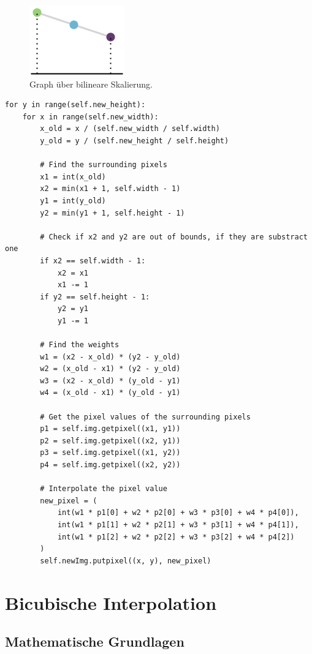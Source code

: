 \begin{figure}
    \centering
    \includegraphics{img/pixel_verdopplung_graph.png}
    \caption{Graph über bilineare Skalierung.}
    \label{fig:my_label}
\end{figure}


\begin{lstlisting}
for y in range(self.new_height):
    for x in range(self.new_width):
        x_old = x / (self.new_width / self.width)
        y_old = y / (self.new_height / self.height)

        # Find the surrounding pixels
        x1 = int(x_old)
        x2 = min(x1 + 1, self.width - 1)
        y1 = int(y_old)
        y2 = min(y1 + 1, self.height - 1)

        # Check if x2 and y2 are out of bounds, if they are substract one
        if x2 == self.width - 1:
            x2 = x1
            x1 -= 1
        if y2 == self.height - 1:
            y2 = y1
            y1 -= 1

        # Find the weights
        w1 = (x2 - x_old) * (y2 - y_old)
        w2 = (x_old - x1) * (y2 - y_old)
        w3 = (x2 - x_old) * (y_old - y1)
        w4 = (x_old - x1) * (y_old - y1)

        # Get the pixel values of the surrounding pixels
        p1 = self.img.getpixel((x1, y1))
        p2 = self.img.getpixel((x2, y1))
        p3 = self.img.getpixel((x1, y2))
        p4 = self.img.getpixel((x2, y2))

        # Interpolate the pixel value
        new_pixel = (
            int(w1 * p1[0] + w2 * p2[0] + w3 * p3[0] + w4 * p4[0]),
            int(w1 * p1[1] + w2 * p2[1] + w3 * p3[1] + w4 * p4[1]),
            int(w1 * p1[2] + w2 * p2[2] + w3 * p3[2] + w4 * p4[2])
        )
        self.newImg.putpixel((x, y), new_pixel)
\end{lstlisting}

\section{Bicubische Interpolation}

\subsection{Mathematische Grundlagen}


